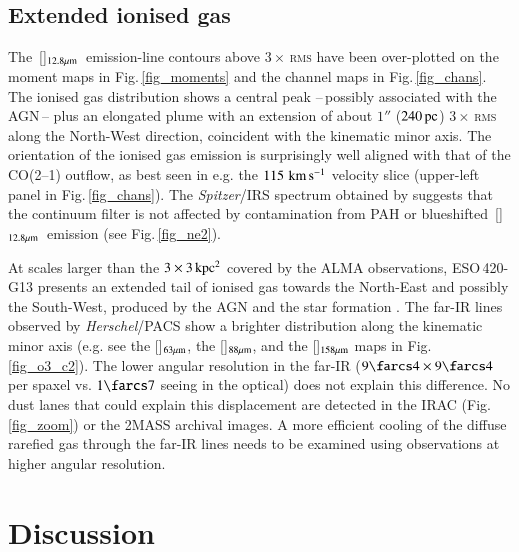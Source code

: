 \documentclass[longauth]{aa}
\newcommand{\kms}{\,\hbox{\hbox{km}\,\hbox{s}$^{-1}$}}
\newcommand{\neii}{\,\hbox{[\ion{Ne}{ii}]$_{\rm 12.8 \mu m}$}}
\begin{document}
\subsection{Extended ionised gas}\label{ion_wind}
The \neii \ emission-line contours above $3 \times$\,\textsc{rms} have been over-plotted on the moment maps in Fig.\,\ref{fig_moments} and the channel maps in Fig.\,\ref{fig_chans}. The ionised gas distribution shows a central peak --\,possibly associated with the AGN\,-- plus an elongated plume with an extension of about $1''$ ($240\, \rm{pc}$) $3 \times$\,\textsc{rms} along the North-West direction, coincident with the kinematic minor axis. The orientation of the ionised gas emission is surprisingly well aligned with that of the CO(2--1) outflow, as best seen in e.g. the $115\, \rm{\kms}$ velocity slice (upper-left panel in Fig.\,\ref{fig_chans}). The \textit{Spitzer}/IRS spectrum obtained by  suggests that the continuum filter is not affected by contamination from PAH or blueshifted \neii \ emission (see Fig.\,\ref{fig_ne2}).



At scales larger than the $3 \times 3\, \rm{kpc^2}$ covered by the ALMA observations, ESO\,420-G13 presents an extended tail of ionised gas towards the North-East and possibly the South-West, produced by the AGN and the star formation . The far-IR lines observed by \textit{Herschel}/PACS  show a brighter distribution along the kinematic minor axis (e.g. see the []$_{\rm 63 \mu m}$, the []$_{\rm 88 \mu m}$, and the []$_{\rm 158 \mu m}$ maps in Fig.\,\ref{fig_o3_c2}). The lower angular resolution in the far-IR ($9\farcs4 \times 9\farcs4$ per spaxel vs. $1\farcs7$ seeing in the optical) does not explain this difference. No dust lanes that could explain this displacement are detected in the IRAC (Fig.\,\ref{fig_zoom}) or the 2MASS archival images. A more efficient cooling of the diffuse rarefied gas through the far-IR lines  needs to be examined using observations at higher angular resolution.







\section{Discussion}\label{discuss}
\end{document}
